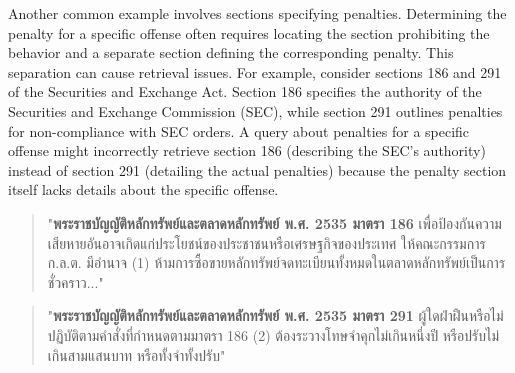 Another common example involves sections specifying penalties. Determining the penalty for a specific offense often requires locating the section prohibiting the behavior and a separate section defining the corresponding penalty. This separation can cause retrieval issues. For example, consider sections 186 and 291 of the Securities and Exchange Act. Section 186 specifies the authority of the Securities and Exchange Commission (SEC), while section 291 outlines penalties for non-compliance with SEC orders. A query about penalties for a specific offense might incorrectly retrieve section 186 (describing the SEC's authority) instead of section 291 (detailing the actual penalties) because the penalty section itself lacks details about the specific offense.

\begin{quote}
\begin{thai}
"\textbf{พระราชบัญญัติหลักทรัพย์และตลาดหลักทรัพย์ พ.ศ. 2535 มาตรา 186 } เพื่อป้องกันความเสียหายอันอาจเกิดแก่ประโยชน์ของประชาชนหรือเศรษฐกิจของประเทศ ให้คณะกรรมการ ก.ล.ต. มีอำนาจ
(1) ห้ามการซื้อขายหลักทรัพย์จดทะเบียนทั้งหมดในตลาดหลักทรัพย์เป็นการชั่วคราว..."        
\end{thai}
\end{quote}

\begin{quote}
\begin{thai}
"\textbf{พระราชบัญญัติหลักทรัพย์และตลาดหลักทรัพย์ พ.ศ. 2535 มาตรา 291 } ผู้ใดฝ่าฝืนหรือไม่ปฏิบัติตามคำสั่งที่กำหนดตามมาตรา 186 (2) ต้องระวางโทษจำคุกไม่เกินหนึ่งปี หรือปรับไม่เกินสามแสนบาท หรือทั้งจำทั้งปรับ"           
\end{thai}
\end{quote}



